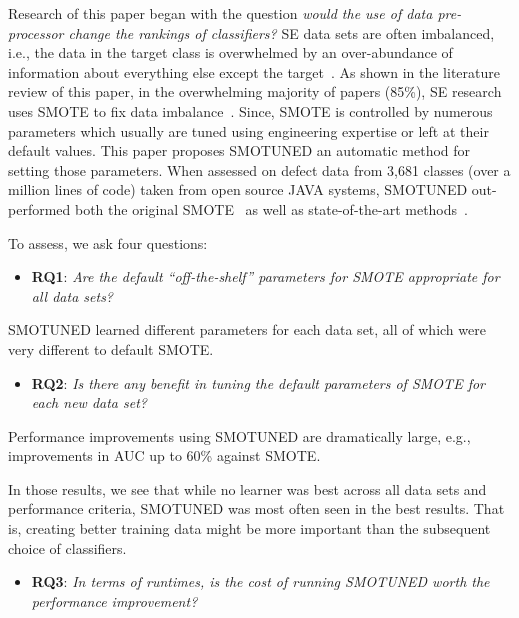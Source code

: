\documentclass[sigconf]{acmart}
\newcommand{\bi}{\begin{itemize}[leftmargin=0.4cm]}
\newcommand{\ei}{\end{itemize}}
\theoremstyle{break}
\newcommand{\sma}{{\sc SMOTE}}
\newcommand{\smb}{{\sc SMOTUNED}}
\begin{document}
Research of this paper began with the question {\em would the use of
data pre-processor change the rankings of classifiers?}
SE data
sets are often imbalanced, i.e., the data in the target class is overwhelmed by an over-abundance of information about everything else except the target~\cite{menzies2007problems}.
As shown in the literature review of this paper, in the overwhelming majority of papers (85\%), SE research uses {\sma} to fix data imbalance~\cite{chawla2002smote}. Since, {\sma} is controlled by numerous parameters which
usually are tuned using engineering expertise or left at their default
values. This paper proposes 
{\smb} an automatic method for setting those parameters.
When assessed on  defect data from 3,681	 classes (over a million lines of code) 
taken from open source JAVA systems,  {\smb} out-performed
both the original SMOTE~\cite{chawla2002smote} as well as state-of-the-art methods~\cite{bennin2017mahakil}.

To assess, we ask four questions: 
 \bi\item
  \textbf{RQ1}:  {\em Are the default ``off-the-shelf'' parameters for {\sma} appropriate for
  all data sets?} 
  \ei
 \begin{lesson}{\smb} learned different parameters for each data set, all of which  were very different to default {\sma}.
 \end{lesson}
  \bi
  \item
  \textbf{RQ2}: {\em   Is  there any benefit in tuning the default parameters of {\sma} for
  each new data set?} 
  \ei
   \begin{lesson}Performance improvements using {\smb} are dramatically large, e.g., improvements in AUC up to 60\% against {\sma}.
 \end{lesson}
In those results, we see that  while no learner was best across all data sets and   performance criteria,
{\smb} was most often seen in the best results.
That is, creating better training data might be more important
than the subsequent choice of classifiers. 
 
  
   \bi
  \item
  \textbf{RQ3}: {\em  In terms of runtimes, is the cost of running {\smb} worth the performance improvement?}
  \ei
  
\end{document}
